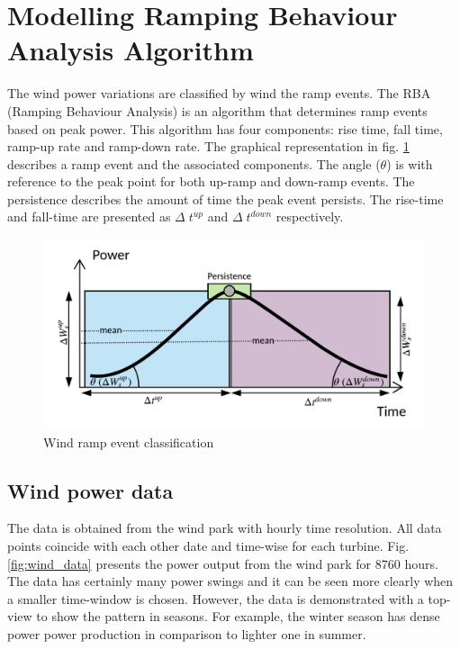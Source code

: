 \section{Modelling Ramping Behaviour Analysis Algorithm} \label{sec:model}

The wind power variations are classified by wind the ramp events. The RBA (Ramping Behaviour Analysis) is an algorithm that determines ramp events based on peak power. This algorithm has four components: rise time, fall time, ramp-up rate and ramp-down rate. The graphical representation in fig. \ref{fig:rba} describes a ramp event and the associated components. The angle ($\theta$) is with reference to the peak point for both up-ramp and down-ramp events. The persistence describes the amount of time the peak event persists. The rise-time and fall-time are presented as $\Delta \; t^{up}$ and $\Delta \; t^{down}$ respectively.

  \begin{figure}[H]
    \centering
    \includegraphics[width=.8\textwidth]{./sec/fig/RBA_new.pdf}
    \caption{Wind ramp event classification}
    \label{fig:rba}
\end{figure}


\subsection{Wind power data}
The data is obtained from the wind park with hourly time resolution. All data points coincide with each other date and time-wise for each turbine. Fig. \ref{fig:wind_data} presents the power output from the wind park for 8760 hours. The data has certainly many power swings and it can be seen more clearly when a smaller time-window is chosen. However, the data is demonstrated with a top-view to show the pattern in seasons. For example, the winter season has dense power power production in comparison to lighter one in summer. 


